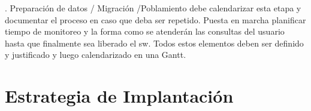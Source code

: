 .
Preparación de datos / Migración /Poblamiento debe calendarizar esta etapa y documentar el proceso en caso que deba ser repetido.
Puesta en marcha planificar tiempo de monitoreo y la forma como se atenderán las consultas del usuario hasta que finalmente sea liberado el sw.
Todos estos elementos deben ser definido y justificado y luego calendarizado en una Gantt.


\section{Estrategia de Implantación}